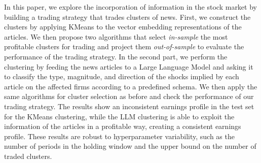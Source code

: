 In this paper, we explore the incorporation of information in the stock market by building a trading strategy that trades clusters of news. First, we construct the clusters by applying KMeans to the vector embedding representations of the articles. We then propose two algorithms that select \textit{in-sample} the most profitable clusters for trading and project them \textit{out-of-sample} to evaluate the performance of the trading strategy. 
In the second part, we perform the clustering by feeding the news articles to a Large Language Model and asking it to classify the type, magnitude, and direction of the shocks implied by each article on the affected firms according to a predefined schema. We then apply the same algorithms for cluster selection as before and check the performance of our trading strategy.
%
The results show an inconsistent earnings profile in the test set for the KMeans clustering, while the LLM clustering is able to exploit the information of the articles in a profitable way, creating a consistent earnings profile. These results are robust to hyperparameter variability, such as the number of periods in the holding window and the upper bound on the number of traded clusters. 

